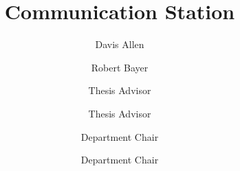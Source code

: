 \documentclass{scu-thesis}
\author{Davis Allen}
\author{Robert Bayer}
\title{Communication Station}
\begin{document}
\frontmatter
\signature{Thesis Advisor}
\signature{Thesis Advisor}
\signature{Department Chair}
\signature{Department Chair}

\maketitle


\tableofcontents
\listoffigures

\mainmatter













\backmatter
\end{document}
